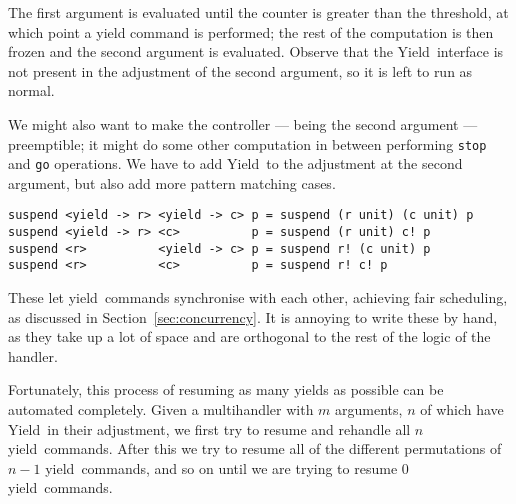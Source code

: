 \documentclass[msc,deptreport,cs]{infthesis} %
\newcommand{\code}[1]{\lstinline{#1}}
\newcommand{\texthighlight}[1]{%
  \colorbox{red!20}{#1}}
\newcommand\yield{\textsf{yield}\xspace}
\newcommand\Yield{\textsf{Yield}\xspace}
\begin{document}
The first argument is evaluated until the counter is greater than the threshold,
at which point a yield command is performed; the rest of the computation is then
frozen and the second argument is evaluated. Observe that the \Yield~interface
is not present in the adjustment of the second argument, so it is left to run
as normal.

We might also want to make the controller --- being the second argument ---
preemptible; it might do some other computation in between performing
\code{stop} and \code{go} operations. We have to add \Yield~to the adjustment at
the second argument, but also add more pattern matching cases.

\begin{lstlisting}[]
suspend <yield -> r> <yield -> c> p = suspend (r unit) (c unit) p
suspend <yield -> r> <c>          p = suspend (r unit) c! p
suspend <r>          <yield -> c> p = suspend r! (c unit) p
suspend <r>          <c>          p = suspend r! c! p
\end{lstlisting}
%




These let \yield~commands synchronise with each other, achieving fair
scheduling, as discussed in Section~\ref{sec:concurrency}. It is annoying to
write these by hand, as they take up a lot of space and are orthogonal to the
rest of the logic of the handler.

Fortunately, this process of resuming as many yields as possible can be
automated completely. Given a multihandler with $m$ arguments, $n$ of which have
\Yield~in their adjustment, we first try to resume and rehandle all $n$
\yield~commands. After this we try to resume all of the different permutations
of $n-1$ \yield~commands, and so on until we are trying to resume 0
\yield~commands.
%
\end{document}
